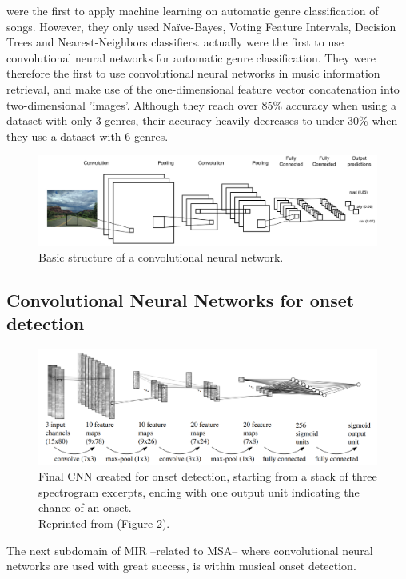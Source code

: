 \textcite{Basili2004classification} were the first to apply machine learning on automatic genre classification of songs. However, they only used Naïve-Bayes, Voting Feature Intervals, Decision Trees and Nearest-Neighbors classifiers. \textcite{Li2010automatic} actually were the first to use convolutional neural networks for automatic genre classification. They were therefore the first to use convolutional neural networks in music information retrieval, and make use of the one-dimensional feature vector concatenation into two-dimensional 'images'. Although they reach over 85\% accuracy when using a dataset with only 3 genres, their accuracy heavily decreases to under 30\% when they use a dataset with 6 genres.
\begin{figure}[t]
    \centering
    \includegraphics[width=1\textwidth]{images/cnn_example}
    \caption{Basic structure of a convolutional neural network.}
    \label{fig:cnn_example}
\end{figure}

\subsection[CNN for onset detection]{Convolutional Neural Networks for onset detection}
\begin{figure}[t]
    \centering
    \includegraphics[width=1\textwidth]{images/onset_detection_cnn}
    \caption{Final CNN created for onset detection, starting from a stack of three spectrogram excerpts, ending with one output unit indicating the chance of an onset.\\
    Reprinted from \textcite{Schluter2014improved} (Figure 2).}
    \label{fig:onset_detection_cnn}
\end{figure}
The next subdomain of MIR --related to MSA-- where convolutional neural networks are used with great success, is within musical onset detection.

